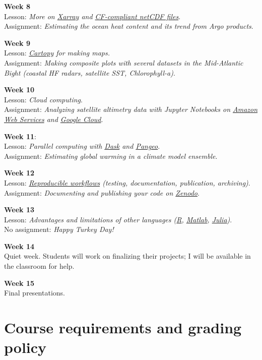 \documentclass[11pt]{article}
\begin{document}
\textbf{Week 8}\\
 Lesson: \textit{More on \href{http://xarray.pydata.org/en/stable/}{Xarray} and \href{https://cfconventions.org}{CF-compliant netCDF files}}.\\
 Assignment: \textit{Estimating the ocean heat content and its trend from Argo products}.


\textbf{Week 9}\\
 Lesson: \textit{\href{https://scitools.org.uk/cartopy/docs/latest/}{Cartopy} for making maps.}\\
 Assignment: \textit{Making composite plots with several datasets in the Mid-Atlantic Bight (coastal HF radars, satellite SST, Chlorophyll-a)}.

\textbf{Week 10}\\
 Lesson: \textit{Cloud computing}.\\
 Assignment: \textit{Analyzing satellite altimetry data with Jupyter Notebooks on \href{https://aws.amazon.com}{Amazon Web Services} and \href{https://cloud.google.com}{Google Cloud}}.

 \textbf{Week 11}:\\
 Lesson:  \textit{Parallel computing with \href{https://dask.org/}{Dask} and \href{https://pangeo.io/}{Pangeo}}.\\
  Assignment: \textit{Estimating global warming in a climate model ensemble}.

\textbf{Week 12}\\
 Lesson: \textit{\href{http://www.practicereproducibleresearch.org/core-chapters/3-basic.html}{Reproducible workflows} (testing, documentation, publication, archiving)}.\\
 Assignment: \textit{Documenting and publishing your code on \href{https://zenodo.org}{Zenodo}}.

\textbf{Week 13}\\
 Lesson: \textit{Advantages and limitations of other languages (\href{https://www.r-project.org/about.html}{R}, \href{https://www.mathworks.com/products/matlab.html}{Matlab}, \href{https://julialang.org/}{Julia})}.\\
 No assignment: \textit{Happy Turkey Day!}

\textbf{Week 14}\\
Quiet week. Students will work on finalizing their projects; I will be available  in the classroom for help.

\textbf{Week 15}\\
Final presentations.


\section*{Course requirements and grading policy}
\end{document}

